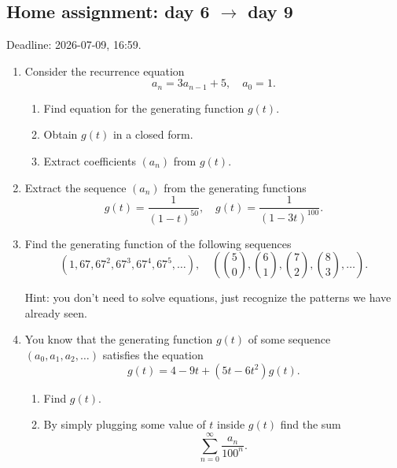 \documentclass[12pt]{article}
\begin{document}





\subsection*{Home assignment: day 6 $\to$ day 9}

Deadline: 2026-07-09, 16:59. 

\begin{enumerate}
    \item Consider the recurrence equation 
    \[
    a_n = 3a_{n-1} + 5, \quad a_0 = 1.
    \]

    \begin{enumerate}
        \item Find equation for the generating function $g(t)$.
        \item Obtain $g(t)$ in a closed form. 
        \item Extract coefficients $(a_n)$ from $g(t)$.
    \end{enumerate}

    \item Extract the sequence $(a_n)$ from the generating functions
    \[
    g(t) = \frac{1}{(1-t)^{50}}, \quad g(t) = \frac{1}{(1-3t)^{100}}.
    \]

    \item Find the generating function of the following sequences 
    \[
    (1, 67, 67^2, 67^3, 67^4, 67^5, \dots), \quad \left({5 \choose 0}, {6 \choose 1}, {7 \choose 2}, {8 \choose 3}, \dots \right).
    \]

    Hint: you don't need to solve equations, just recognize the patterns we have already seen. 

    \item You know that the generating function $g(t)$ of some sequence $(a_0, a_1, a_2, \ldots)$ satisfies the equation 
    \[
    g(t) = 4-9t + (5t - 6t^2)g(t).
    \]
    \begin{enumerate}
        \item Find $g(t)$.
        \item By simply plugging some value of $t$ inside $g(t)$ find the sum
        \[
        \sum_{n=0}^{\infty} \frac{a_n}{100^n}.
        \]
    \end{enumerate}


\end{enumerate}
\end{document}
